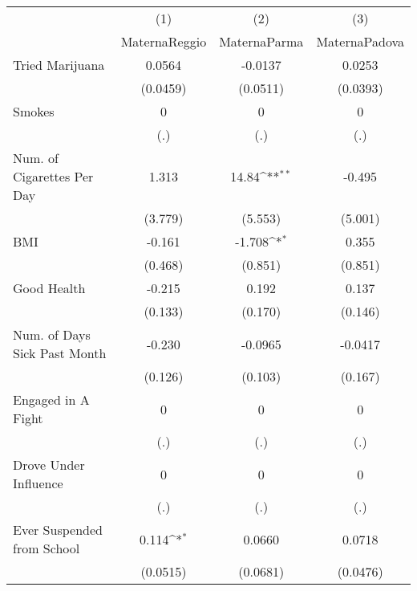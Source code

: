 {
\def\sym#1{\ifmmode^{#1}\else\(^{#1}\)\fi}
\begin{tabular}{l*{3}{c}}
\hline\hline
            &\multicolumn{1}{c}{(1)}&\multicolumn{1}{c}{(2)}&\multicolumn{1}{c}{(3)}\\
            &\multicolumn{1}{c}{MaternaReggio}&\multicolumn{1}{c}{MaternaParma}&\multicolumn{1}{c}{MaternaPadova}\\
\hline
Tried Marijuana&      0.0564         &     -0.0137         &      0.0253         \\
            &    (0.0459)         &    (0.0511)         &    (0.0393)         \\
[1em]
Smokes      &           0         &           0         &           0         \\
            &         (.)         &         (.)         &         (.)         \\
[1em]
Num. of Cigarettes Per Day&       1.313         &       14.84\sym{**} &      -0.495         \\
            &     (3.779)         &     (5.553)         &     (5.001)         \\
[1em]
BMI         &      -0.161         &      -1.708\sym{*}  &       0.355         \\
            &     (0.468)         &     (0.851)         &     (0.851)         \\
[1em]
Good Health &      -0.215         &       0.192         &       0.137         \\
            &     (0.133)         &     (0.170)         &     (0.146)         \\
[1em]
Num. of Days Sick Past Month&      -0.230         &     -0.0965         &     -0.0417         \\
            &     (0.126)         &     (0.103)         &     (0.167)         \\
[1em]
Engaged in A Fight&           0         &           0         &           0         \\
            &         (.)         &         (.)         &         (.)         \\
[1em]
Drove Under Influence&           0         &           0         &           0         \\
            &         (.)         &         (.)         &         (.)         \\
[1em]
Ever Suspended from School&       0.114\sym{*}  &      0.0660         &      0.0718         \\
            &    (0.0515)         &    (0.0681)         &    (0.0476)         \\

\end{tabular}}
